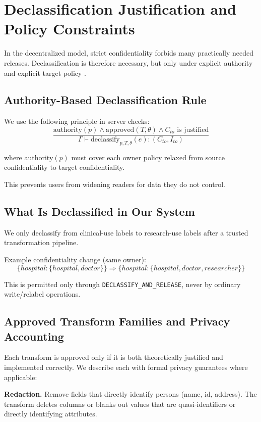 \section{Declassification Justification and Policy Constraints}

In the decentralized model, strict confidentiality forbids many practically needed releases. Declassification is therefore necessary, but only under explicit authority and explicit target policy \cite{MyersLiskov97}.

\subsection{Authority-Based Declassification Rule}

We use the following principle in server checks:
\[
\frac{\text{authority}(p) \land \text{approved}(T,\theta) \land C_{to} \text{ is justified}}
  {\Gamma \vdash \text{declassify}_{p,T,\theta}(e):(C_{to}, I_{to})}
\]

where authority$(p)$ must cover each owner policy relaxed from source confidentiality to target confidentiality.

This prevents users from widening readers for data they do not control.

\subsection{What Is Declassified in Our System}

We only declassify from clinical-use labels to research-use labels after a trusted transformation pipeline.

Example confidentiality change (same owner):
\[
\{hospital:\{hospital,doctor\}\} \Rightarrow \{hospital:\{hospital,doctor,researcher\}\}
\]

This is permitted only through \texttt{DECLASSIFY\_AND\_RELEASE}, never by ordinary write/relabel operations.

\subsection{Approved Transform Families and Privacy Accounting}

Each transform is approved only if it is both theoretically justified and implemented correctly. We describe each with formal privacy guarantees where applicable:

\textbf{Redaction.} Remove fields that directly identify persons (name, id, address). The transform deletes columns or blanks out values that are quasi-identifiers or directly identifying attributes.

